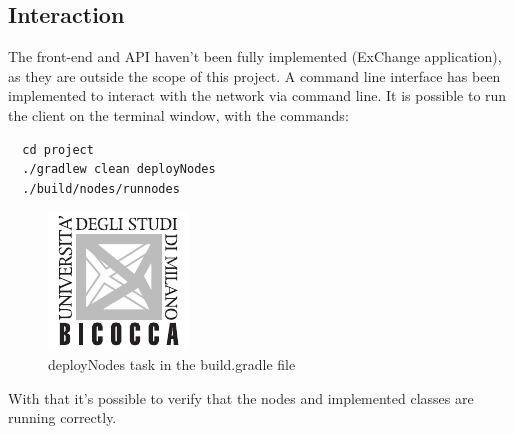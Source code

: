 \subsection{Interaction}
The front-end and API haven't been fully implemented (ExChange application), as they are outside the scope of this project. A command line interface has been implemented to interact with the network via command line. It is possible to run the client on the terminal window, with the commands:
\begin{verbatim}
  cd project
  ./gradlew clean deployNodes
  ./build/nodes/runnodes 
\end{verbatim}

\begin{figure}[h]
    \centering
    \includegraphics[]{logo_unimib.pdf}
    \caption{
        deployNodes task in the build.gradle file
         }
\end{figure}

With that it's possible to verify that the nodes and implemented classes are running correctly.